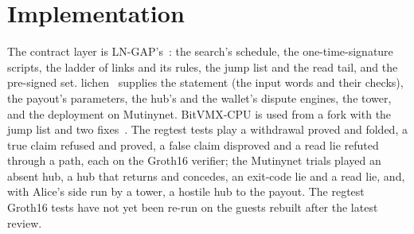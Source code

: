 \documentclass[11pt]{article}
\begin{document}
\section{Implementation}
\label{sec:impl}

The contract layer is LN-GAP's~\cite{lngapcode}: the search's schedule,
the one-time-signature scripts, the ladder of links and its rules, the
jump list and the read tail, and the pre-signed set. lichen~\cite{lichencode}
supplies the statement (the input words and their checks), the payout's
parameters, the hub's and the wallet's dispute engines, the tower, and
the deployment on Mutinynet. BitVMX-CPU is used from a fork with the
jump list and two fixes~\cite{bitvmxfork}. The regtest tests play a
withdrawal proved and folded, a true claim refused and proved, a false
claim disproved and a read lie refuted through a path, each on the
Groth16 verifier; the Mutinynet trials played an absent hub, a hub that
returns and concedes, an exit-code lie and a read lie, and, with Alice's
side run by a tower, a hostile hub to the payout. The regtest Groth16
tests have not yet been re-run on the guests rebuilt after the latest
review.
\end{document}
